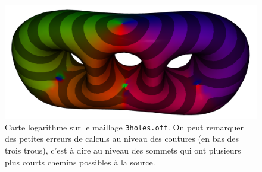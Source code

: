 \documentclass[11pt]{article}
\begin{document}
	\begin{figure}
		\centering
		\includegraphics[width=14cm]{log_cut_locus.png}
		\caption{Carte logarithme sur le maillage \texttt{3holes.off}. On peut remarquer des petites erreurs de calculs au niveau des coutures (en bas des trois trous), c'est à dire au niveau des sommets qui ont plusieurs plus courts chemins possibles à la source.}
		\label{fig:cut_locus}
	\end{figure}
\end{document}
